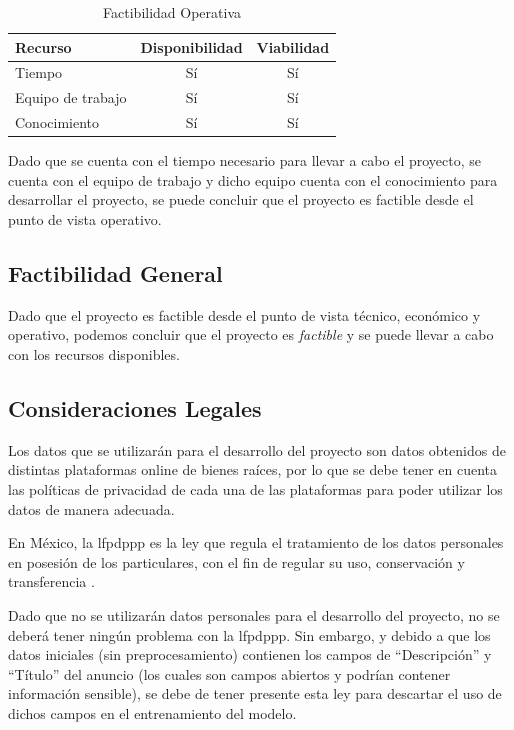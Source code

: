 \begin{table}[H]
\centering
\begin{tabular}{|p{5cm}|c|c|}
\hline
\rowcolor{azulclaro}
  \centering\textbf{Recurso} & \centering\textbf{Disponibilidad}\arraybackslash & \centering\textbf{Viabilidad}\arraybackslash \\
\hline
Tiempo & Sí & Sí \\
\hline
  Equipo de trabajo & Sí & Sí \\
\hline
Conocimiento & Sí & Sí \\
\hline
\end{tabular}
\caption{Factibilidad Operativa}
\label{table:factibilidad_operativa}
\end{table}

Dado que se cuenta con el tiempo necesario para llevar a cabo el proyecto, se
cuenta con el equipo de trabajo y dicho equipo cuenta con el conocimiento para
desarrollar el proyecto, se puede concluir que el proyecto es factible desde el
punto de vista operativo.

\subsection{Factibilidad General}

Dado que el proyecto es factible desde el punto de vista técnico, económico y
operativo, podemos concluir que el proyecto es \textit{factible} y se puede
llevar a cabo con los recursos disponibles.

\subsection{Consideraciones Legales}

Los datos que se utilizarán para el desarrollo del proyecto son datos obtenidos
de distintas plataformas online de bienes raíces, por lo que se debe tener en
cuenta las políticas de privacidad de cada una de las plataformas para poder
utilizar los datos de manera adecuada.

En México, la \acrfull{lfpdppp} es la ley que regula el tratamiento de los datos
personales en posesión de los particulares, con el fin de regular su uso,
conservación y transferencia \cite{dof2010lfpdppp}.

Dado que no se utilizarán datos personales para el desarrollo del proyecto, no
se deberá tener ningún problema con la \acrshort{lfpdppp}. Sin embargo, y debido a que los
datos iniciales (sin preprocesamiento) contienen los campos de ``Descripción'' y ``Título'' del anuncio (los cuales
son campos abiertos y podrían contener información sensible), se debe de tener
presente esta ley para descartar el uso de dichos campos en el entrenamiento del modelo.

